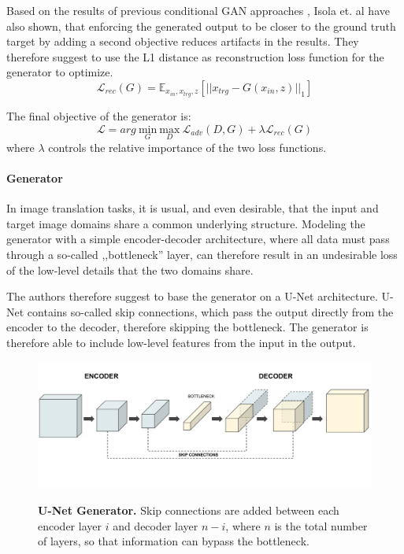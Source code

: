 \documentclass[12pt]{report}
\begin{document}
Based on the results of previous conditional GAN approaches \cite{pathak_context_2016}, Isola et. al \cite{isola_image--image_2016} have also shown, that enforcing the generated output to be closer to the ground truth target by adding a second objective reduces artifacts in the results. They therefore suggest to use the L1 distance as reconstruction loss function for the generator to optimize.
\begin{equation}
\mathcal{L}_{rec}(G) = \mathbb{E}_{x_{in},x_{trg},z}[||x_{trg}-G(x_{in},z)||_{1}]
\label{eq:pix2pix_loss_rec}
\end{equation}

The final objective of the generator is:
\begin{equation}
\mathcal{L} = arg \ \underset{G}{\mathrm{min}} \ \underset{D}{\mathrm{max}} \ \mathcal{L}_{adv}(D,G) + \lambda \mathcal{L}_{rec}(G)
\end{equation}
where $\lambda$ controls the relative importance of the two loss functions.


\paragraph{Generator}
In image translation tasks, it is usual, and even desirable, that the input and target image domains share a common underlying structure. Modeling the generator with a simple encoder-decoder architecture, where all data must pass through a so-called ,,bottleneck'' layer, can therefore result in an undesirable loss of the low-level details that the two domains share. 

The authors therefore suggest to base the generator on a U-Net architecture. U-Net contains so-called skip connections, which pass the output directly from the encoder to the decoder, therefore skipping the bottleneck. The generator is therefore able to include low-level features from the input in the output.

\begin{figure}[h]
\centering
{\includegraphics[width=\linewidth]{03_analysis/gans/u-net}}
\caption{\label{fig:u-net} \textbf{U-Net Generator.} Skip connections are added between each encoder layer $i$ and decoder layer $n - i$, where $n$ is the total number of layers, so that information can bypass the bottleneck.}
\end{figure}
\end{document}
